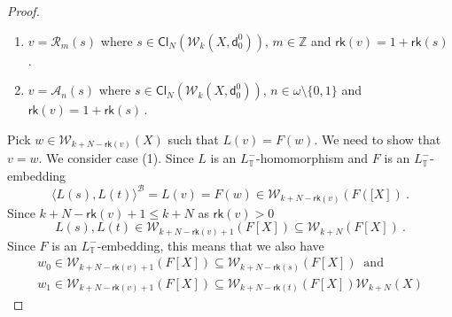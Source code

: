\documentclass[10pt,a4paper, openany,  oldfontcommands]{memoir}
\newtheorem{open problem} [theorem] {Open Problem}
\newtheorem{open question} [theorem] {Open Question}
\begin{document}
\begin{proof}
\begin{enumerate}
\item  $  v  =   \mathcal{R}_m \left(  s  \right)   $  where  
$  s  \in     \mathsf{Cl}_{N}  \left(  \mathcal{W}_{k}  \left( X    ,   \mathsf{d}^0_0    \right)   \right)   $, 
  $  m  \in  \mathbb{Z}  $
  and  $  \mathsf{rk} \left(  v  \right)  =  1  +  \mathsf{rk} \left(  s \right)      \,   $. 



 
 
 
 

\item  $  v  =   \mathcal{A}_n \left(  s  \right)   $  where  
$  s  \in    \mathsf{Cl}_{N}  \left(  \mathcal{W}_{k}  \left( X     ,   \mathsf{d}^0_0      \right)   \right)    $, 
  $ n  \in  \omega  \setminus  \lbrace 0, 1  \rbrace   $
  and  $  \mathsf{rk} \left(  v  \right)  =  1  +  \mathsf{rk} \left(  s \right)      \,   $. 
 \end{enumerate}
Pick     $  w  \in  \mathcal{W}_{k + N- \mathsf{rk} \left( v  \right)  }  \left( X  \right)    $
such that  $  L(v)  =  F(w)  $.  
We need to show that  $  v  =  w  $. 
We consider  case  (1). 
Since  $L$ is an $L_{  \mathbb{T} }^-  $-homomorphism  and  $F$  is  an   $L_{  \mathbb{T} }^-  $-embedding
\[
\langle  L(s), L(t)   \rangle^{  \mathcal{B}  } 
= L(v)  = F(w)   \in  
 \mathcal{W}_{k + N- \mathsf{rk} \left(   v \right)  }  \left(   F  \left([ X  \right]   \right)   
 \     . 
\]
Since  $   k + N- \mathsf{rk}  \left(   v \right)  +1  \leq  k+N $  as  $   \mathsf{rk}  \left(   v \right)   >  0  $
\[
  L(s), L(t)  \in       
   \mathcal{W}_{ k + N  - \mathsf{rk}  \left(   v \right)  +1  }  \left(     F  \left[  X   \right]   \right)  
  \subseteq   \mathcal{W}_{ k + N  }  \left(     F  \left[  X   \right]   \right)  
  \      .
  \]
Since  $  F$ is an  $L_{  \mathbb{T} }^-  $-embedding, this means that we also have  
\begin{multline*}
 w_0    \in     \mathcal{W}_{ k + N  - \mathsf{rk}  \left(   v \right)  +1  }  \left(     F  \left[  X   \right]   \right)  
\subseteq  
   \mathcal{W}_{ k + N  - \mathsf{rk}  \left(   s \right)   }  \left(     F  \left[  X   \right]   \right)  
\     \mbox{  and   }      \   
\\
 w_1    \in     \mathcal{W}_{ k + N  - \mathsf{rk}  \left(   v \right)  +1  }  \left(     F  \left[  X   \right]   \right)  
\subseteq  
   \mathcal{W}_{ k + N  - \mathsf{rk}  \left(   t \right)   }  \left(     F  \left[  X   \right]   \right)  
 \mathcal{W}_{k + N }  \left( X  \right)    
   \end{multline*}

\end{proof}
\end{document}
